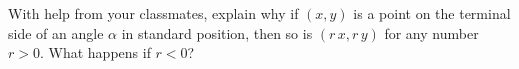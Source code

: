 \documentclass{ximera}
\begin{document}
\begin{question}
\begin{problem}
\begin{solution}

\end{solution}
\end{problem}

\end{question}

\begin{problem}
With help from your classmates, explain why if $(x,y)$ is a point on the terminal side of an angle $\alpha$ in standard position, then so is $(r\,x, r\,y)$ for any number $r > 0$.  What happens if $r < 0$?

\end{problem}
\end{document}
